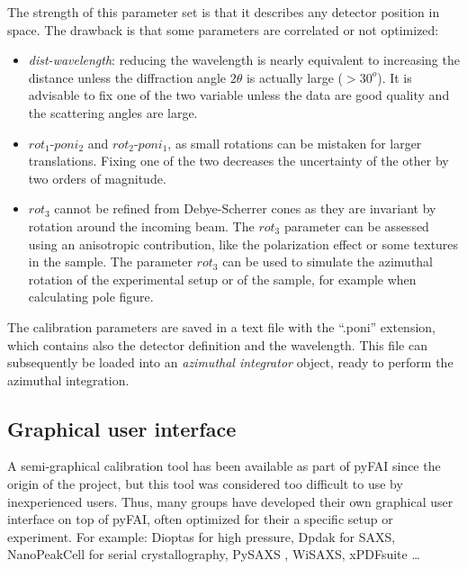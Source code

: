 \documentclass[preprint]{iucr}              %
\begin{document}
The strength of this parameter set is that it describes any detector position in
space. 
The drawback is that some parameters are correlated or not optimized:

\begin{itemize}
  \item \textit{dist-wavelength}: reducing the wavelength is nearly equivalent
  to increasing the distance unless the diffraction angle $2\theta$ is actually
  large ($>30^o$). 
  It is advisable to fix one of the two variable unless the data are good
  quality and the scattering angles are large.
  \item $rot_1$-$poni_2$ and $rot_2$-$poni_1$, as small rotations can be
  mistaken for larger translations. 
  Fixing one of the two decreases the uncertainty of the other by two orders of
  magnitude.
  \item $rot_3$ cannot be refined from Debye-Scherrer cones as they are
  invariant by rotation around the incoming beam. The $rot_3$ parameter can be
   assessed using an anisotropic contribution, like the polarization effect or
  some  textures in the sample.
  The parameter $rot_3$ can be used to simulate the azimuthal rotation of
  the experimental setup or of the sample, for example when calculating pole
  figure.
\end{itemize}
 

The calibration parameters are saved in a text file with the ``.poni''
extension, which contains also the detector definition and the wavelength.
This file can subsequently be loaded into an \textit{azimuthal integrator}
object, ready to perform the azimuthal integration.

\subsection{Graphical user interface}

A semi-graphical calibration tool has been available as part of pyFAI
\cite{fv5028} since the origin of the project, but this tool was considered too
difficult to use by inexperienced users.
Thus, many groups have developed their own graphical user interface on top of
pyFAI, often optimized for their a specific setup or experiment.
For example: Dioptas \cite{diopta_publi} for high pressure, Dpdak \cite{dpdak}
for SAXS, NanoPeakCell \cite{nanopeakcell} for serial crystallography,
PySAXS \cite{pysaxs}, WiSAXS, xPDFsuite \cite{xpdfsuite}\ldots
\end{document}
